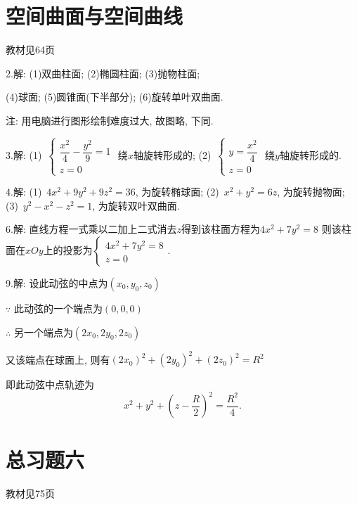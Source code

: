\section{空间曲面与空间曲线}
\begin{flushright}
  \color{zhanqing!80}
   教材见64页
\end{flushright}

  2.解: (1)双曲柱面; \quad (2)椭圆柱面; \quad (3)抛物柱面;

  (4)球面; \quad (5)圆锥面(下半部分); \quad (6)旋转单叶双曲面.

  {\small 注: 用电脑进行图形绘制难度过大, 故图略, 下同.}

  3.解: (1)~$\begin{cases} \dfrac{x^2}{4} - \dfrac{y^2}{9} = 1 \\ z = 0 \end{cases}$ 绕$x$轴旋转形成的; \quad
  (2)~$\begin{cases} y = \dfrac{x^2}{4} \\ z = 0 \end{cases}$ 绕$y$轴旋转形成的.

  4.解: (1)~$4x^2 + 9y^2 + 9z^2 = 36$, 为旋转椭球面; \quad
  (2)~$x^2 + y^2 = 6z$, 为旋转抛物面; \quad
  (3)~$y^2 - x^2 - z^2 = 1$, 为旋转双叶双曲面.

  6.解: 直线方程一式乘以二加上二式消去$z$得到该柱面方程为$4x^2 + 7y^2 = 8$
  则该柱面在$xOy$上的投影为$\begin{cases} 4x^2 + 7y^2 = 8 \\ z = 0 \end{cases}$.

  9.解: 设此动弦的中点为$\left( x_0,y_0,z_0 \right)$

  $\because$ 此动弦的一个端点为$(0,0,0)$

  $\therefore$ 另一个端点为$\left( 2x_0,2y_0,2z_0 \right)$

  又该端点在球面上, 则有$\left( 2x_0 \right)^2 + \left( 2y_0 \right)^2 + \left( 2z_0 \right)^2 = R^2$

  即此动弦中点轨迹为
  $$x^2 + y^2 + \left( z - \dfrac{R}{2} \right)^2 = \dfrac{R^2}{4}.$$

\section*{总习题六}
\begin{flushright}
  \color{zhanqing!80}
   教材见75页
\end{flushright}

